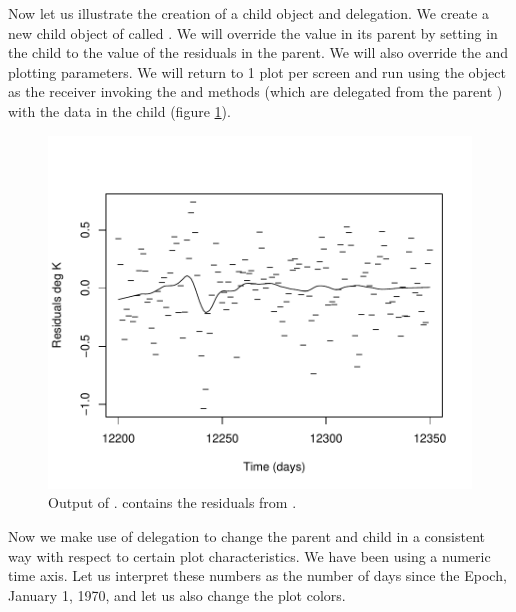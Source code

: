 \documentclass{Z}
\newlength{\half}
\begin{document}
Now let us illustrate the creation of a child object and delegation.
We create a new child object of  called .  We
will override the  value in its parent by setting  in
the child to the value of the residuals in the parent.  We will also
override the  and  plotting parameters.  We will
return to 1 plot per screen and run  using the
 object as the receiver invoking the  and
 methods (which are delegated from the parent )
with the data in the child (figure \ref{fig:smoothing04}).


\begin{figure}[h!]
\begin{center}
\includegraphics[width=\half]{proto-smoothing04}
\end{center}
\caption{Output of .
 contains the residuals from .}
\label{fig:smoothing04}
\end{figure}
Now we make use of delegation to change the parent
and child in a consistent way with respect to certain plot characteristics.
We have been using a numeric time axis.
Let us interpret these numbers as the number of days since the Epoch,
January 1, 1970, and let us also change the plot colors.

\begin{Schunk}
\end{Schunk}
\end{document}
